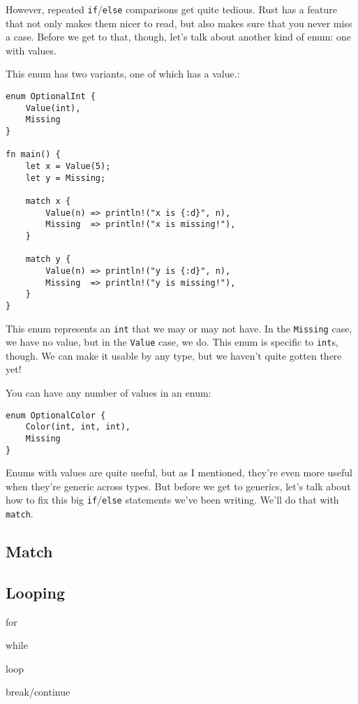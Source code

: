 \documentclass[]{article}
\begin{document}
However, repeated \texttt{if}/\texttt{else} comparisons get quite
tedious. Rust has a feature that not only makes them nicer to read, but
also makes sure that you never miss a case. Before we get to that,
though, let's talk about another kind of enum: one with values.

This enum has two variants, one of which has a value.:

\begin{verbatim}
enum OptionalInt {
    Value(int),
    Missing
}

fn main() {
    let x = Value(5);
    let y = Missing;

    match x {
        Value(n) => println!("x is {:d}", n),
        Missing  => println!("x is missing!"),
    }

    match y {
        Value(n) => println!("y is {:d}", n),
        Missing  => println!("y is missing!"),
    }
}
\end{verbatim}

This enum represents an \texttt{int} that we may or may not have. In the
\texttt{Missing} case, we have no value, but in the \texttt{Value} case,
we do. This enum is specific to \texttt{int}s, though. We can make it
usable by any type, but we haven't quite gotten there yet!

You can have any number of values in an enum:

\begin{verbatim}
enum OptionalColor {
    Color(int, int, int),
    Missing
}
\end{verbatim}

Enums with values are quite useful, but as I mentioned, they're even
more useful when they're generic across types. But before we get to
generics, let's talk about how to fix this big \texttt{if}/\texttt{else}
statements we've been writing. We'll do that with \texttt{match}.

\subsection{Match}\label{match}

\subsection{Looping}\label{looping}

for

while

loop

break/continue
\end{document}
